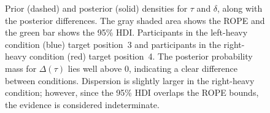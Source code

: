 \documentclass[doc,biblatex]{apa7}
\begin{document}
\begin{figure}
\vspace*{2pt}
\caption{Prior (dashed) and posterior (solid) densities for $\tau$ and $\delta$, along with the posterior differences. The gray shaded area shows the ROPE and the green bar shows the 95\% HDI. Participants in the left-heavy condition (blue) target position~3 and participants in the right-heavy condition (red) target position~4. The posterior probability mass for $\Delta(\tau)$ lies well above 0, indicating a clear difference between conditions. Dispersion is slightly larger in the right-heavy condition; however, since the 95\% HDI overlaps the ROPE bounds, the evidence is considered indeterminate.}
\label{fig12}
\end{figure}
\end{document}
